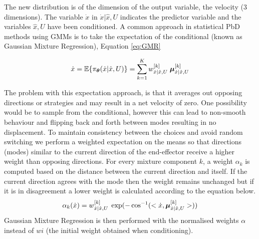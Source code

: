 The new distribution is of the dimension of the output variable, the velocity (3 dimensions). 
The variable $\dot{x}$ in $\dot{x}|\hat{x},U$ indicates the predictor variable and the variables $\hat{x},U$ have been conditioned.
A common approach in statistical PbD methods using GMMs is to take the expectation of the conditional (known as Gaussian Mixture Regression), Equation \ref{eq:GMR}

\begin{equation} \label{eq:GMR}
 \dot{x} = \mathbb{E}\{\pi_{\boldsymbol{\theta}}(\dot{x}|\hat{x},U)\} = \sum\limits_{k=1}^{K}  w^{[k]}_{\dot{x}|\hat{x},U} \; \boldsymbol{\mu}^{[k]}_{\dot{x}|\hat{x},U}
\end{equation}

The problem with this expectation approach, is that it averages out opposing directions or strategies and may result in 
a net velocity of zero. One possibility would be to sample from the conditional, however this can lead to non-smooth 
behaviour and flipping back and forth between modes resulting in no displacement. To maintain consistency between the
choices and avoid random switching  we perform a weighted expectation on the means so that 
directions (modes) similar to the current direction of the end-effector receive
a higher weight than opposing directions. For every mixture component $k$, a weight $\alpha_k$ is computed based 
on the distance between the current direction and itself.
If the current direction agrees with the mode then the weight remains unchanged but if it is in
disagreement a lower weight is
calculated according to the equation below. 
\begin{equation}  \label{eq:weight}
  \alpha_{k}(\dot{x}) = w^{[k]}_{\dot{x}|\hat{x},U} \; \exp(-\cos^{-1}(<\dot{x},\boldsymbol{\mu}^{[k]}_{\dot{x}|\hat{x},U}>))
\end{equation}
Gaussian Mixture Regression is then performed with the normalised  weights $\alpha$ instead of $wi$
(the initial weight obtained when conditioning).

